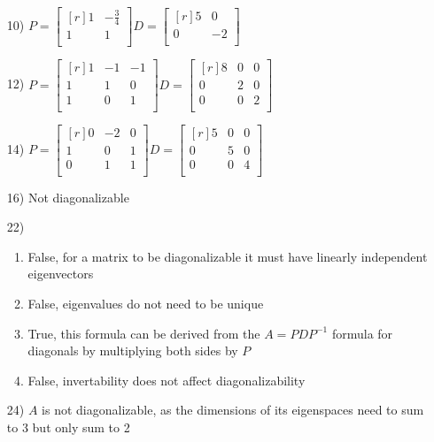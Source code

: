 \documentclass{article}
\begin{document}
\begin{enumerate}
  \item[10)]
    $P = \begin{bmatrix*}[r]
      1 & -\frac{3}{4} \\
      1 & 1 \\
    \end{bmatrix*} 
    D = \begin{bmatrix*}[r]
      5 & 0 \\
      0 & -2 \\
    \end{bmatrix*}$ 
  \item[12)]
    $P = \begin{bmatrix*}[r]
      1 & -1 & -1 \\ 
      1 & 1 & 0 \\ 
      1 & 0 & 1 \\
    \end{bmatrix*}
    D = \begin{bmatrix*}[r]
      8 & 0 & 0 \\
      0 & 2 & 0 \\
      0 & 0 & 2 \\
    \end{bmatrix*}$

  \item[14)]
    $P = \begin{bmatrix*}[r]
      0 & -2 & 0 \\
      1 & 0 & 1 \\
      0 & 1 & 1 \\
    \end{bmatrix*}
    D = \begin{bmatrix*}[r]
      5 & 0 & 0 \\
      0 & 5 & 0 \\
      0 & 0 & 4 \\
    \end{bmatrix*}$

  \item[16)]
    Not diagonalizable
  
  \item[22)]
    \begin{enumerate}
    \item
      False, for a matrix to be diagonalizable it must have 
      linearly independent eigenvectors
    \item 
      False, eigenvalues do not need to be unique

    \item
      True, this formula can be derived from the 
      $A = PDP^{-1}$ formula for diagonals by multiplying both
      sides by $P$
    \item 
      False, invertability does not affect diagonalizability
    \end{enumerate}

  \item[24)]
    $A$ is not diagonalizable, as the dimensions of its
    eigenspaces need to sum to 3 but only sum to 2
\end{enumerate}
\end{document}
